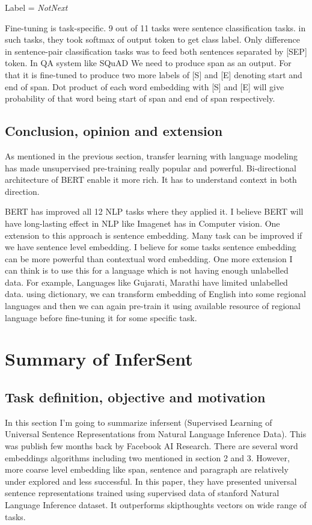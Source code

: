 \documentclass[11pt,a4paper]{article}
\begin{document}
Label = \textit{\small NotNext}

Fine-tuning is task-specific. 9 out of 11 tasks were sentence classification tasks. in such tasks, they took softmax of output token to get class label. Only difference in sentence-pair classification tasks was to feed both sentences separated by [SEP] token. In QA system like SQuAD We need to produce span as an output. For that it is fine-tuned to produce two  more labels of [S] and [E] denoting start and end of span. Dot product of each word embedding with [S] and [E] will give probability of that word being start of span and end of span respectively. 


\subsection{Conclusion, opinion and extension}
As mentioned in the previous section, transfer learning with language modeling has made unsupervised pre-training really popular and powerful. Bi-directional architecture of BERT enable it more rich. It has to understand context in both direction.

BERT has improved all 12 NLP tasks where they applied it. I believe BERT will have long-lasting effect in NLP like Imagenet has in Computer vision. One extension to this approach is sentence embedding. Many task can be improved if we have sentence level embedding. I believe for some tasks sentence embedding can be more powerful than contextual word embedding.  One more extension I can think is to use this for a language which is not having enough unlabelled data. For example, Languages like Gujarati, Marathi have limited unlabelled data. using dictionary, we can transform embedding of English into some regional languages and then we can again pre-train it using available resource of regional language before fine-tuning it for some specific task.


\section{Summary of InferSent}

\subsection{Task definition, objective and motivation}
In this section I'm going to summarize infersent (Supervised Learning of Universal Sentence Representations from Natural Language Inference Data). This was publish few months back by Facebook AI Research. There are several word embeddings algorithms including two mentioned in section 2 and 3. However, more coarse level embedding like span, sentence and paragraph are relatively under explored and less successful. In this paper, they have presented universal sentence representations trained using supervised data of stanford Natural Language Inference dataset. It outperforms skipthoughts vectors on wide range of tasks. 
\end{document}
